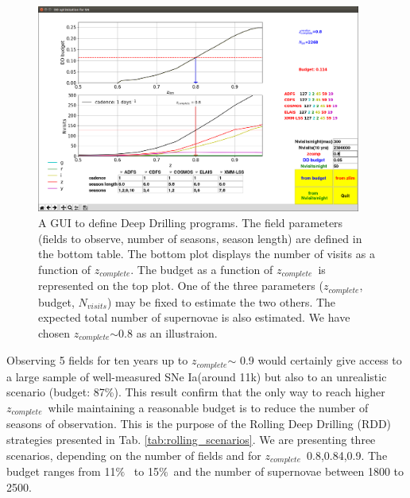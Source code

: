 \documentclass[\docopts]{\docclass}
\newcommand{\sne}{{SNe Ia}}
\newcommand{\zcomp}{\mbox{$z_{complete}$}}
\newcommand{\per}{$\%$}
\newcommand{\nvisits}{$N_{visits}$}
\begin{document}
{\begin{figure}[htbp]
\begin{center}
  \includegraphics[width=0.95\textwidth]{budget_GUI.png}
 \caption{A GUI to define Deep Drilling programs. The field parameters (fields to observe, number of seasons, season length) are defined in the bottom table. The bottom plot displays the number of visits as a function of \zcomp. The budget as a function of \zcomp~is represented on the top plot. One of the three parameters (\zcomp, budget, \nvisits) may be fixed to estimate the two others. The expected total number of supernovae is also estimated. We have chosen \zcomp$\sim$0.8 as an illustraion.}\label{fig:budget_gui}
\end{center}
\end{figure}
Observing 5 fields for ten years up to \zcomp$\sim$ 0.9 would certainly give access to a large sample of well-measured \sne (around 11k) but also to an unrealistic scenario (budget: 87\%). This result confirm that the only way to reach higher \zcomp~while maintaining a reasonable budget is to reduce the number of seasons of observation. This is the purpose of the Rolling Deep Drilling (RDD) strategies presented in Tab. \ref{tab:rolling_scenarios}. We are presenting three scenarios, depending on the number of fields and for \zcomp~0.8,0.84,0.9. The budget ranges from 11\per~ to 15\per~and the number of supernovae between 1800 to 2500.

}
\end{document}
